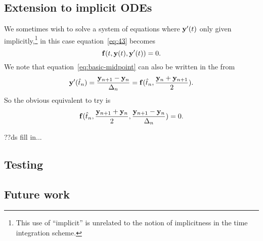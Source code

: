 \subsection{Extension to implicit ODEs}

We sometimes wish to solve a system of equations where $\mathbf{y}'(t)$ only given implicitly,\footnote{This use of ``implicit'' is unrelated to the notion of implicitness in the time integration scheme.} in this case equation~\eqref{eq:43} becomes
\begin{equation}
  {\mathbf{f}}(t, \mathbf{y}(t), \mathbf{y}'(t)) = 0.
\end{equation}
We note that equation~\eqref{eq:basic-midpoint} can also be written in the from
\begin{equation}
  \mathbf{y}'(\hat{t}_{n}) = \frac{\mathbf{y}_{n+1} - \mathbf{y}_n}{\Delta_{n}} =  {\mathbf{f}}(\hat{t}_{n}, \frac{\mathbf{y}_n + \mathbf{y}_{n+1}}{2}).
\end{equation}
So the obvious equivalent to try is
\begin{equation}
  {\mathbf{f}}(\hat{t}_{n}, \frac{\mathbf{y}_{n+1} + \mathbf{y}_n}{2}, \frac{\mathbf{y}_{n+1} - \mathbf{y}_n}{\Delta_{n}}) = 0.
\end{equation}



??ds fill in...

\subsection{Testing}




\subsection{Future work}




